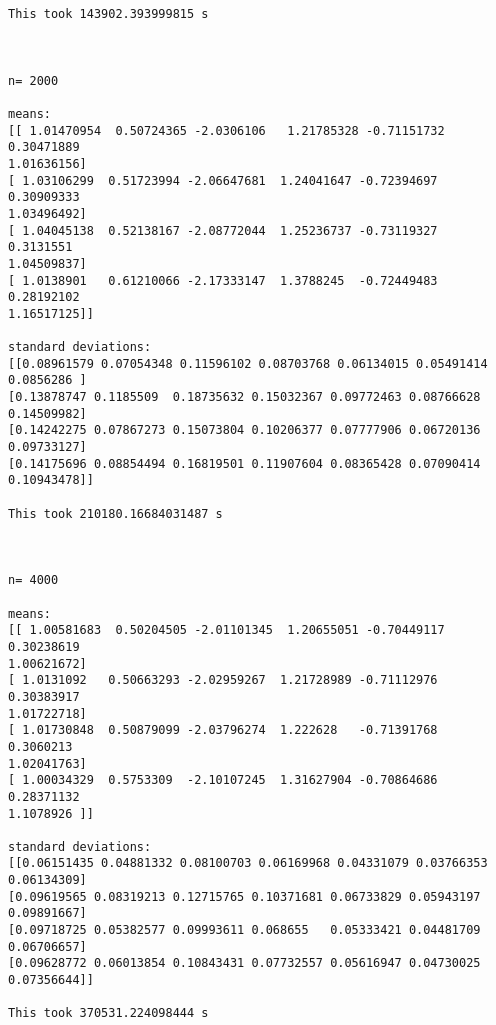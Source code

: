 \documentclass{article}
\theoremstyle{definition}
\theoremstyle{remark}
\begin{document}
\begin{verbatim}
This took 143902.393999815 s



n= 2000

means: 
[[ 1.01470954  0.50724365 -2.0306106   1.21785328 -0.71151732  0.30471889
1.01636156]
[ 1.03106299  0.51723994 -2.06647681  1.24041647 -0.72394697  0.30909333
1.03496492]
[ 1.04045138  0.52138167 -2.08772044  1.25236737 -0.73119327  0.3131551
1.04509837]
[ 1.0138901   0.61210066 -2.17333147  1.3788245  -0.72449483  0.28192102
1.16517125]]

standard deviations: 
[[0.08961579 0.07054348 0.11596102 0.08703768 0.06134015 0.05491414
0.0856286 ]
[0.13878747 0.1185509  0.18735632 0.15032367 0.09772463 0.08766628
0.14509982]
[0.14242275 0.07867273 0.15073804 0.10206377 0.07777906 0.06720136
0.09733127]
[0.14175696 0.08854494 0.16819501 0.11907604 0.08365428 0.07090414
0.10943478]]

This took 210180.16684031487 s



n= 4000

means: 
[[ 1.00581683  0.50204505 -2.01101345  1.20655051 -0.70449117  0.30238619
1.00621672]
[ 1.0131092   0.50663293 -2.02959267  1.21728989 -0.71112976  0.30383917
1.01722718]
[ 1.01730848  0.50879099 -2.03796274  1.222628   -0.71391768  0.3060213
1.02041763]
[ 1.00034329  0.5753309  -2.10107245  1.31627904 -0.70864686  0.28371132
1.1078926 ]]

standard deviations: 
[[0.06151435 0.04881332 0.08100703 0.06169968 0.04331079 0.03766353
0.06134309]
[0.09619565 0.08319213 0.12715765 0.10371681 0.06733829 0.05943197
0.09891667]
[0.09718725 0.05382577 0.09993611 0.068655   0.05333421 0.04481709
0.06706657]
[0.09628772 0.06013854 0.10843431 0.07732557 0.05616947 0.04730025
0.07356644]]

This took 370531.224098444 s
\end{verbatim}
\end{document}
